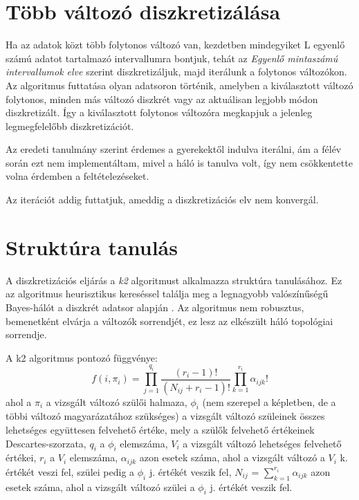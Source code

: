 \section{Több változó diszkretizálása}
Ha az adatok közt több folytonos változó van, kezdetben mindegyiket L egyenlő számú adatot tartalmazó intervallumra bontjuk, tehát az \textit{Egyenlő mintaszámú intervallumok elve} szerint diszkretizáljuk,  majd iterálunk a folytonos változókon. Az algoritmus futtatása olyan adatsoron történik, amelyben a kiválasztott változó folytonos, minden más változó diszkrét vagy az aktuálisan legjobb módon diszkretizált. Így a kiválasztott folytonos változóra megkapjuk a jelenleg legmegfelelőbb diszkretizációt.

Az eredeti tanulmány szerint érdemes a gyerekektől indulva iterálni, ám a félév során ezt nem implementáltam, mivel a háló is tanulva volt, így nem csökkentette volna érdemben a feltételezéseket.

Az iterációt addig futtatjuk, ameddig a diszkretizációs elv nem konvergál.

\section{Struktúra tanulás}
A diszkretizációs eljárás a \emph{k2} algoritmust alkalmazza struktúra tanulásához. Ez az algoritmus heurisztikus kereséssel találja meg a legnagyobb valószínűségű Bayes-hálót a diszkrét adatsor alapján \cite{ruiz2005illustration}. Az algoritmus nem robusztus, bemenetként elvárja a változók sorrendjét, ez lesz az elkészült háló topológiai sorrendje.

A k2 algoritmus pontozó függvénye:
$$ f(i, \pi_{i}) =
\prod_{j = 1}^{q_{i}} \frac{(r_{i} - 1)!}{(N_{ij} + r_{i} - 1)!}
\prod_{k = 1}^{r_{i}} \alpha_{ijk}!$$
ahol a $\pi_{i}$ a vizsgált változó szülői halmaza, $\phi_{i}$ (nem szerepel a képletben, de a többi változó magyarázatához szükséges) a vizsgált változó szüleinek összes lehetséges együttesen felvehető értéke, mely a szülők felvehető értékeinek Descartes-szorzata, $q_{i}$ a $\phi_{i}$ elemszáma, $V_{i}$ a vizsgált változó lehetséges felvehető értékei, $r_{i}$ a $V_{i}$ elemszáma, $\alpha_{ijk}$ azon esetek száma, ahol a vizsgált változó a $V_{i}$ k. értékét veszi fel, szülei pedig a $\phi_{i}$ j. értékét veszik fel, $N_{ij}$ = $\sum_{k = 1}^{r_{i}}\alpha_{ijk}$ azon esetek száma, ahol a vizsgált változó szülei a $\phi_{i}$ j. értékét veszik fel.

